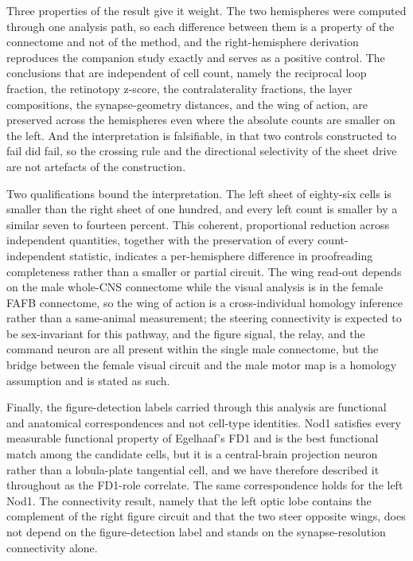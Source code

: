 \documentclass[11pt]{article}
\begin{document}
Three properties of the result give it weight. The two hemispheres were computed through one
analysis path, so each difference between them is a property of the connectome and not of the
method, and the right-hemisphere derivation reproduces the companion study exactly and serves as
a positive control. The conclusions that are independent of cell count, namely the reciprocal
loop fraction, the retinotopy z-score, the contralaterality fractions, the layer compositions,
the synapse-geometry distances, and the wing of action, are preserved across the hemispheres even
where the absolute counts are smaller on the left. And the interpretation is falsifiable, in that
two controls constructed to fail did fail, so the crossing rule and the directional selectivity
of the sheet drive are not artefacts of the construction.

Two qualifications bound the interpretation. The left sheet of eighty-six cells is smaller than
the right sheet of one hundred, and every left count is smaller by a similar seven to fourteen
percent. This coherent, proportional reduction across independent quantities, together with the
preservation of every count-independent statistic, indicates a per-hemisphere difference in
proofreading completeness rather than a smaller or partial circuit. The wing read-out depends on
the male whole-CNS connectome while the visual analysis is in the female FAFB connectome, so the
wing of action is a cross-individual homology inference rather than a same-animal measurement;
the steering connectivity is expected to be sex-invariant for this pathway, and the figure
signal, the relay, and the command neuron are all present within the single male connectome, but
the bridge between the female visual circuit and the male motor map is a homology assumption and
is stated as such.

Finally, the figure-detection labels carried through this analysis are functional and anatomical
correspondences and not cell-type identities. Nod1 satisfies every measurable functional property
of Egelhaaf's FD1 and is the best functional match among the candidate cells, but it is a
central-brain projection neuron rather than a lobula-plate tangential cell, and we have therefore
described it throughout as the FD1-role correlate. The same correspondence holds for the left
Nod1. The connectivity result, namely that the left optic lobe contains the complement of the
right figure circuit and that the two steer opposite wings, does not depend on the
figure-detection label and stands on the synapse-resolution connectivity alone.
\end{document}

